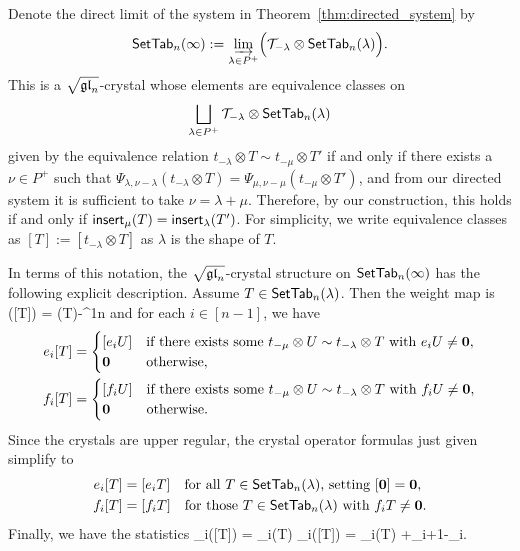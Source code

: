 \documentclass[11pt]{article}
\begin{document}
Denote the direct limit of the system in Theorem~\ref{thm:directed_system} by
\begin{equation}
\label{eq:direct_limit_def}
\mathsf{SetTab}_n(\infty) := \varinjlim_{\lambda \in P^+} \Bigl(\mathcal{T}_{-\lambda} \otimes \mathsf{SetTab}_n(\lambda)\Bigr).
\end{equation}
This is a $\sqrt{\mathfrak{gl}_n}$-crystal whose elements are equivalence classes on
\[
\bigsqcup_{\lambda \in P^+} \mathcal{T}_{-\lambda} \otimes \mathsf{SetTab}_n(\lambda)
\]
given by the equivalence relation $t_{-\lambda} \otimes T \sim t_{-\mu} \otimes T'$ if and only if there exists a $\nu \in P^+$ such that $\Psi_{\lambda,\nu-\lambda}(t_{-\lambda} \otimes T) = \Psi_{\mu,\nu-\mu}(t_{-\mu} \otimes T')$, and from our directed system it is sufficient to take $\nu = \lambda + \mu$.
Therefore, by our construction, this holds if and only if $\mathsf{insert}_{\mu}(T) = \mathsf{insert}_{\lambda}(T')$.
For simplicity, we write equivalence classes as $[T] := [t_{-\lambda} \otimes T]$ as $\lambda$ is the shape of $T$.


In terms of this notation, the $\sqrt{\mathfrak{gl}_n}$-crystal structure on $\mathsf{SetTab}_n(\infty)$ has the following explicit description.
Assume $T \in\mathsf{SetTab}_n(\lambda)$.
Then the weight map is
\be
\weight([T]) = \weight(T)-\lambda \in \ZZ^{1\oplus n}
\ee
and for each $i\in [n-1]$, we have
\begin{subequations}
\label{raising-limit-eq0}
\begin{align}
e_i[T] &= \begin{cases} 
[e_iU]&\text{if there exists some $t_{-\mu}\otimes U \sim t_{-\lambda}\otimes T$ with $e_i U\neq \boldsymbol{0}$}, \\
\boldsymbol{0}&\text{otherwise},
\end{cases}
\\
f_i[T] &= \begin{cases} 
[f_iU]&\text{if there exists some 
$t_{-\mu}\otimes U \sim t_{-\lambda}\otimes T$ with $f_i U\neq \boldsymbol{0}$}, \\
\boldsymbol{0}&\text{otherwise}.
\end{cases}
\end{align}
\end{subequations}
Since the crystals are upper regular, the crystal operator formulas just given simplify to
\begin{subequations}
\label{raising-limit-eq}
\begin{align}
e_i[T] &= [e_i T] \quad\text{for all $T \in \mathsf{SetTab}_n(\lambda)$, setting } [\boldsymbol{0}] = \boldsymbol{0},
\\
f_i[T] &= [f_i T] \quad \text{for those $T \in \mathsf{SetTab}_n(\lambda)$ with } f_i T \neq \boldsymbol{0}.
\end{align}
\end{subequations}
Finally, we have the statistics
\be\label{string-Tcol-eq}
\varepsilon_i([T]) = \varepsilon_i(T)
\qquand
\varphi_i([T]) = \varphi_i(T) +\lambda_{i+1}-\lambda_i.
\ee
\end{document}
